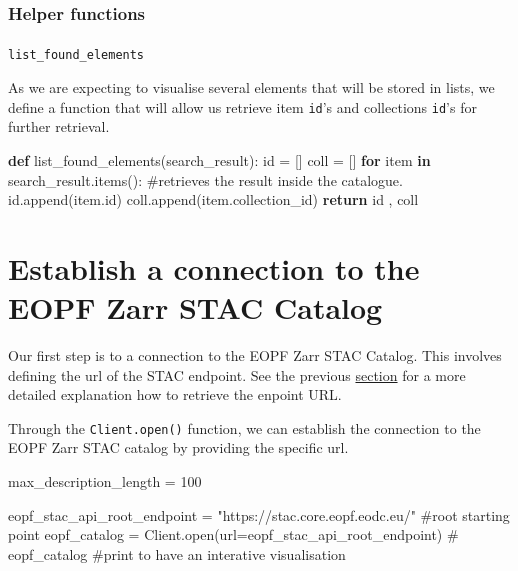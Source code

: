 \documentclass[
  letterpaper,
  DIV=11,
  numbers=noendperiod]{scrreprt}
\makeatletter
\let\oldparagraph\paragraph
\renewcommand{\paragraph}{
    \@ifstar
      \xxxParagraphStar
      \xxxParagraphNoStar
  }
\newcommand{\xxxParagraphStar}[1]{\oldparagraph*{#1}\mbox{}}
\newcommand{\xxxParagraphNoStar}[1]{\oldparagraph{#1}\mbox{}}
\newenvironment{Shaded}{\begin{snugshade}}{\end{snugshade}}
\newcommand{\BuiltInTok}[1]{\textcolor[rgb]{0.00,0.23,0.31}{#1}}
\newcommand{\CommentTok}[1]{\textcolor[rgb]{0.37,0.37,0.37}{#1}}
\newcommand{\ControlFlowTok}[1]{\textcolor[rgb]{0.00,0.23,0.31}{\textbf{#1}}}
\newcommand{\DecValTok}[1]{\textcolor[rgb]{0.68,0.00,0.00}{#1}}
\newcommand{\KeywordTok}[1]{\textcolor[rgb]{0.00,0.23,0.31}{\textbf{#1}}}
\newcommand{\NormalTok}[1]{\textcolor[rgb]{0.00,0.23,0.31}{#1}}
\newcommand{\OperatorTok}[1]{\textcolor[rgb]{0.37,0.37,0.37}{#1}}
\newcommand{\StringTok}[1]{\textcolor[rgb]{0.13,0.47,0.30}{#1}}
\makeatother
\begin{document}
\subsubsection{Helper functions}\label{helper-functions-2}

\paragraph{\texorpdfstring{\texttt{list\_found\_elements}}{list\_found\_elements}}\label{list_found_elements-1}

As we are expecting to visualise several elements that will be stored in
lists, we define a function that will allow us retrieve item
\texttt{id}'s and collections \texttt{id}'s for further retrieval.

\begin{Shaded}
\begin{Highlighting}[]
\KeywordTok{def}\NormalTok{ list\_found\_elements(search\_result):}
    \BuiltInTok{id} \OperatorTok{=}\NormalTok{ []}
\NormalTok{    coll }\OperatorTok{=}\NormalTok{ []}
    \ControlFlowTok{for}\NormalTok{ item }\KeywordTok{in}\NormalTok{ search\_result.items(): }\CommentTok{\#retrieves the result inside the catalogue.}
        \BuiltInTok{id}\NormalTok{.append(item.}\BuiltInTok{id}\NormalTok{)}
\NormalTok{        coll.append(item.collection\_id)}
    \ControlFlowTok{return} \BuiltInTok{id}\NormalTok{ , coll}
\end{Highlighting}
\end{Shaded}

\section{Establish a connection to the EOPF Zarr STAC
Catalog}\label{establish-a-connection-to-the-eopf-zarr-stac-catalog-1}

Our first step is to a connection to the EOPF Zarr STAC Catalog. This
involves defining the url of the STAC endpoint. See the previous
\hyperref[access-the-eopf-zarr-stac-api-with-python]{section} for a more
detailed explanation how to retrieve the enpoint URL.

Through the \texttt{Client.open()} function, we can establish the
connection to the EOPF Zarr STAC catalog by providing the specific url.

\begin{Shaded}
\begin{Highlighting}[]
\NormalTok{max\_description\_length }\OperatorTok{=} \DecValTok{100}

\NormalTok{eopf\_stac\_api\_root\_endpoint }\OperatorTok{=} \StringTok{"https://stac.core.eopf.eodc.eu/"} \CommentTok{\#root starting point}
\NormalTok{eopf\_catalog }\OperatorTok{=}\NormalTok{ Client.}\BuiltInTok{open}\NormalTok{(url}\OperatorTok{=}\NormalTok{eopf\_stac\_api\_root\_endpoint)}
\CommentTok{\# eopf\_catalog  \#print to have an interative visualisation}
\end{Highlighting}
\end{Shaded}
\end{document}
